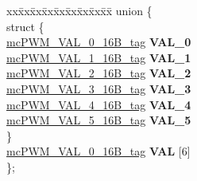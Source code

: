 \begin{DoxyCompactItemize}
\begin{tabbing}
\end{tabbing}\item 
\mbox{\label{structmcPWM__SUBMOD__struct__tag_a7cc40c75bf9cce1c6357b1f5e01d9587}} 
\begin{tabbing}
xx\=xx\=xx\=xx\=xx\=xx\=xx\=xx\=xx\=\kill
union \{\\
\mbox{\label{unionmcPWM__SUBMOD__struct__tag_1_1_0D1982_a75162b6bfe56491b38139091f02bee9a}} 
\>struct \{\\
\>\>\mbox{\hyperlink{unionmcPWM__VAL__0__16B__tag}{mcPWM\_VAL\_0\_16B\_tag}} {\bfseries VAL\_0}\\
\>\>\mbox{\hyperlink{unionmcPWM__VAL__1__16B__tag}{mcPWM\_VAL\_1\_16B\_tag}} {\bfseries VAL\_1}\\
\>\>\mbox{\hyperlink{unionmcPWM__VAL__2__16B__tag}{mcPWM\_VAL\_2\_16B\_tag}} {\bfseries VAL\_2}\\
\>\>\mbox{\hyperlink{unionmcPWM__VAL__3__16B__tag}{mcPWM\_VAL\_3\_16B\_tag}} {\bfseries VAL\_3}\\
\>\>\mbox{\hyperlink{unionmcPWM__VAL__4__16B__tag}{mcPWM\_VAL\_4\_16B\_tag}} {\bfseries VAL\_4}\\
\>\>\mbox{\hyperlink{unionmcPWM__VAL__5__16B__tag}{mcPWM\_VAL\_5\_16B\_tag}} {\bfseries VAL\_5}\\
\>\} \\
\>\mbox{\hyperlink{unionmcPWM__VAL__0__16B__tag}{mcPWM\_VAL\_0\_16B\_tag}} {\bfseries VAL} \mbox{[}6\mbox{]}\\
\}; \\


\end{tabbing}
\end{DoxyCompactItemize}
